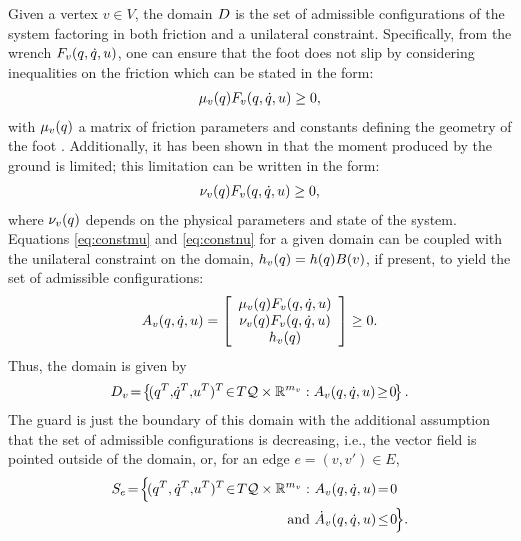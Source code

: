 Given a vertex $v \in V$, the domain $D$ is the set of admissible configurations of the system factoring in both friction and a unilateral constraint.
%
Specifically, from the wrench $F_{v}(q, \dot{q}, u)$, one can ensure that the foot does not slip by considering inequalities on the friction which can be stated in the form:
%
\begin{align}
  \label{eq:constmu}
  \mu_{v}(q) F_{v}(q, \dot{q}, u) \geq 0,
\end{align}
%
with $\mu_{v}(q)$ a matrix of friction parameters and constants defining the geometry of the foot \cite{Grizzle2010}.
%
Additionally, it has been shown in \cite{Chevallereau2009,Vukobratovic1990} that the moment produced by the ground is limited; this limitation can be written in the form:
%
\begin{align}
  \label{eq:constnu}
  \nu_{v}(q) F_{v}(q, \dot{q}, u) \geq 0,
\end{align}
%
where $\nu_{v}(q)$ depends on the physical parameters and state of the system.
%
Equations \eqref{eq:constmu} and \eqref{eq:constnu} for a given domain can be coupled with the unilateral constraint on the domain, $h_{v}(q) = h(q) B(v)$, if present, to yield the set of admissible configurations:
%
\begin{align}
  \label{admissible}
  A_{v}(q, \dot{q}, u) = \left[ \begin{array}{c}
      \mu_{v}(q) F_{v}(q, \dot{q}, u)\\
      \nu_{v}(q) F_{v}(q, \dot{q}, u)\\
      h_{v}(q)
    \end{array} \right] \geq 0.
\end{align}
%
Thus, the domain is given by
%
\begin{align}
  \label{eq:domain}
  \D_{v} \! = \! \left\{ \! (q^{T}, \! \dq^{T}, \! \uu^{T})^{T} \! \in \! T\Q \times \R^{m_{v}} : A_{v}\argsqdqu \! \geq \! 0 \! \right\}.
\end{align}
%
The guard is just the boundary of this domain with the additional assumption that the set of admissible configurations is decreasing, i.e., the vector field is pointed outside of the domain, or, for an edge $e = (v, v') \in E$,
%
\begin{align}
  S_{e} \! = \! \Bigl\{ \!(\q^{T}, \dq^{T}, \! \uu^{T})^{T} \! \in \! T\Q \times \R^{m_v} : \ &A_{v}\argsqdqu \! = \! 0 \\
  \nonumber
  \mathrm{and} \ &{\dot A}_{v}\argsqdqu \! \leq \! 0 \! \Bigl\}.
\end{align}

